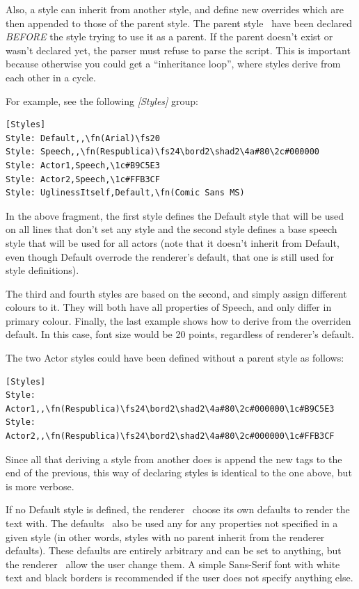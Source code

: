 \documentclass{spec}
\begin{document}
Also, a style can inherit from another style, and define new overrides which are then appended to those
of the parent style. The parent style \must\ have been declared \emph{BEFORE} the style trying to use
it as a parent. If the parent doesn't exist or wasn't declared yet, the parser must refuse to parse the
script. This is important because otherwise you could get a ``inheritance loop'', where styles derive from
each other in a cycle.

For example, see the following \emph{[Styles]} group:

\begin{verbatim}
[Styles]
Style: Default,,\fn(Arial)\fs20
Style: Speech,,\fn(Respublica)\fs24\bord2\shad2\4a#80\2c#000000
Style: Actor1,Speech,\1c#B9C5E3
Style: Actor2,Speech,\1c#FFB3CF
Style: UglinessItself,Default,\fn(Comic Sans MS)
\end{verbatim}

In the above fragment, the first style defines the Default style that will be used on all lines that
don't set any style and the second style defines a base speech style that will be used for all actors
(note that it doesn't inherit from Default, even though Default overrode the renderer's default, that
one is still used for style definitions).

The third and fourth styles are based on the second, and simply assign different colours to it. They
will both have all properties of Speech, and only differ in primary colour. Finally, the last example
shows how to derive from the overriden default. In this case, font size would be 20 points, regardless
of renderer's default.

The two Actor styles could have been defined without a parent style as follows:

\begin{verbatim}
[Styles]
Style: Actor1,,\fn(Respublica)\fs24\bord2\shad2\4a#80\2c#000000\1c#B9C5E3
Style: Actor2,,\fn(Respublica)\fs24\bord2\shad2\4a#80\2c#000000\1c#FFB3CF
\end{verbatim}

Since all that deriving a style from another does is append the new tags to the end of the previous,
this way of declaring styles is identical to the one above, but is more verbose.

If no Default style is defined, the renderer \must\ choose its own defaults to render the text with.
The defaults \must\ also be used any for any properties not specified in a given style (in other words,
styles with no parent inherit from the renderer defaults). These defaults are entirely arbitrary and
can be set to anything, but the renderer \should\ allow the user change them. A simple Sans-Serif font
with white text and black borders is recommended if the user does not specify anything else.
\end{document}
